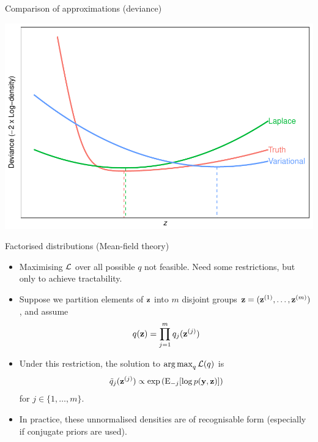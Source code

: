 \begin{frame}{Comparison of approximations (deviance)}
  \vspace{-5pt}
  \begin{center}
    \includegraphics[scale=0.7]{figure/compare6}
  \end{center}
\end{frame}

\begin{frame}{Factorised distributions (Mean-field theory)}
  \vspace{-20pt}
  \begin{itemize}
    \item Maximising ${\mathcal L}$ over all possible $q$ not feasible. Need some restrictions, but only to achieve tractability.
    \item Suppose we partition elements of ${\mathbf z}$ into $m$ disjoint groups ${\mathbf z} = ({\mathbf z}^{(1)}, \dots, {\mathbf z}^{(m)})$, and assume
    \[
      q({\mathbf z}) = \prod_{j=1}^m q_j({\mathbf z}^{(j)})
    \]
    \item Under this restriction, the solution to $\operatorname*{arg\,max}_q {\mathcal L}(q)$ is
    \begin{align}\label{eq:meanfieldsoln}
      \tilde q_j({\mathbf z}^{(j)}) \propto \exp\left(\operatorname{E}_{-j}[\log p({\mathbf y},{\mathbf z})]\right)
    \end{align}
    for $j \in \{1,\dots,m\}$.
    \item In practice, these unnormalised densities are of recognisable form (especially if conjugate priors are used).
    \vspace{4pt}
  \end{itemize}
\end{frame}

